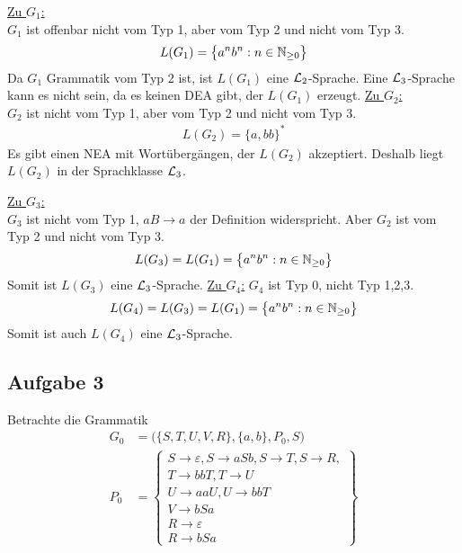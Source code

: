 \begin{lösung}
	\underline{Zu $G_1$:}	\\
	$G_1$ ist offenbar nicht vom Typ 1, aber vom Typ 2 und nicht vom Typ 3.
	 \begin{align*}
	 	L(G_1)=\big\lbrace a^n b^n:n\in\mathbb{N}_{\geq0}\big\rbrace
	 \end{align*}
	 Da $G_1$ Grammatik vom Typ 2 ist, ist $L(G_1)$ eine $\mathcal{L}_2$-Sprache. 
	 Eine $\mathcal{L}_3$-Sprache kann es nicht sein, da es keinen DEA gibt, der $L(G_1)$ erzeugt.\nl
	 \underline{Zu $G_2$:}\\
	 $G_2$ ist nicht vom Typ 1, aber vom Typ 2 und nicht vom Typ 3. 
	 \begin{align*}
	 	L(G_2)=\big\lbrace a,bb\big\rbrace^\ast
	 \end{align*}
	 Es gibt einen NEA mit Wortübergängen, der $L(G_2)$ akzeptiert.
	 Deshalb liegt $L(G_2)$ in der Sprachklasse $\mathcal{L}_3$.
	 


	\underline{Zu $G_3$:}\\
	$G_3$ ist nicht vom Typ 1, $aB\to a$ der Definition widerspricht. 
	Aber $G_2$ ist vom Typ 2 und nicht vom Typ 3.
	\begin{align*}
		L(G_3)=L(G_1)=\big\lbrace a^n b^n:n\in\mathbb{N}_{\geq0}\big\rbrace
	\end{align*}
	Somit ist $L(G_3)$ eine $\mathcal{L}_3$-Sprache.\nl
	\underline{Zu $G_4$:}
	$G_4$ ist Typ 0, nicht Typ 1,2,3.
	\begin{align*}
		L(G_4)=L(G_3)=L(G_1)=\big\lbrace a^n b^n:n\in\mathbb{N}_{\geq0}\big\rbrace
	\end{align*}
	Somit ist auch $L(G_4)$ eine $\mathcal{L}_3$-Sprache.
\end{lösung} 

\subsection{Aufgabe 3}
Betrachte die Grammatik
\begin{align*}
	G_0&=\Big(\lbrace S,T,U,V,R\rbrace,\lbrace a,b\rbrace,P_0,S\Big)\\
	P_0&=\left\lbrace
		\begin{array}{c}
			 S\to\varepsilon,S\to aSb,S\to T,S\to R,\\
			 T\to bbT, T\to U\\
			 U\to aa U,U\to bbT\\
			 V\to bSa\\
			 R\to\varepsilon\\
			 R\to bSa
		\end{array}\right\rbrace		
\end{align*}
	
